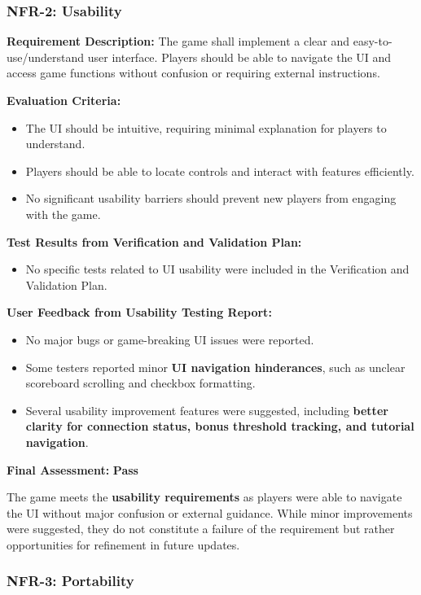 \documentclass[12pt, titlepage]{article}
\begin{document}
\subsubsection{NFR-2: Usability}

\textbf{Requirement Description:}  
The game shall implement a clear and easy-to-use/understand user interface. Players should be able to navigate the UI and access game functions without confusion or requiring external instructions.

\textbf{Evaluation Criteria:}  
\begin{itemize}
    \item The UI should be intuitive, requiring minimal explanation for players to understand.
    \item Players should be able to locate controls and interact with features efficiently.
    \item No significant usability barriers should prevent new players from engaging with the game.
\end{itemize}

\textbf{Test Results from Verification and Validation Plan:}  
\begin{itemize}
    \item No specific tests related to UI usability were included in the Verification and Validation Plan.
\end{itemize}

\textbf{User Feedback from Usability Testing Report:}  
\begin{itemize}
    \item No major bugs or game-breaking UI issues were reported.
    \item Some testers reported minor \textbf{UI navigation hinderances}, such as unclear scoreboard scrolling and checkbox formatting.
    \item Several usability improvement features were suggested, including \textbf{better clarity for connection status, bonus threshold tracking, and tutorial navigation}.
\end{itemize}

\textbf{Final Assessment:} \textbf{Pass}  

The game meets the \textbf{usability requirements} as players were able to navigate the UI without major confusion or external guidance. While minor improvements were suggested, they do not constitute a failure of the requirement but rather opportunities for refinement in future updates.

\subsubsection{NFR-3: Portability}
\end{document}
